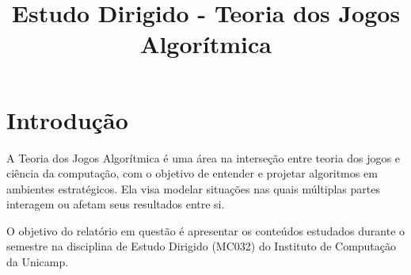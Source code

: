 \documentclass[twoside,conference,a4paper]{IEEEtran}
\begin{document}
    \renewcommand{\IEEEkeywordsname}{Keywords}
    
    
    \title{Estudo Dirigido - Teoria dos Jogos Algorítmica}
    \author{%
    }
    
    
    \maketitle
    
        

    
    \begin{IEEEkeywords}
        
    \end{IEEEkeywords}
    
    \section{Introdução}
        A Teoria dos Jogos Algorítmica é uma área na interseção entre teoria dos jogos e ciência da computação, com o objetivo de entender e projetar algoritmos em ambientes estratégicos. Ela visa modelar situações nas quais múltiplas partes interagem ou afetam seus resultados entre si.
        
        O objetivo do relatório em questão é apresentar os conteúdos estudados durante o semestre na disciplina de Estudo Dirigido (MC032) do Instituto de Computação da Unicamp.
        
\end{document}
